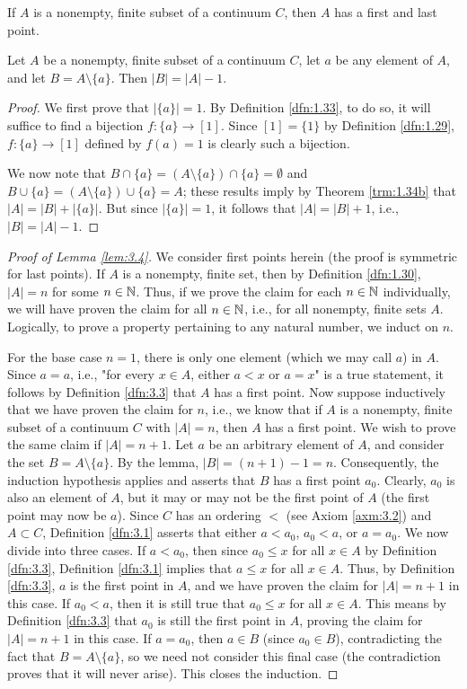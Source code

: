 \documentclass[../main.tex]{subfiles}
\begin{document}
\begin{lemma}\label{lem:3.4}
    If $A$ is a nonempty, finite subset of a continuum $C$, then $A$ has a first and last point.
    \begin{lemma*}
        Let $A$ be a nonempty, finite subset of a continuum $C$, let $a$ be any element of $A$, and let $B=A\setminus\{a\}$. Then $|B|=|A|-1$.
        \begin{proof}
            We first prove that $|\{a\}|=1$. By Definition \ref{dfn:1.33}, to do so, it will suffice to find a bijection $f:\{a\}\to[1]$. Since $[1]=\{1\}$ by Definition \ref{dfn:1.29}, $f:\{a\}\to[1]$ defined by $f(a)=1$ is clearly such a bijection.\par
            We now note that $B\cap\{a\}=(A\setminus\{a\})\cap\{a\}=\emptyset$ and $B\cup\{a\}=(A\setminus\{a\})\cup\{a\}=A$; these results imply by Theorem \ref{trm:1.34b} that $|A|=|B|+|\{a\}|$. But since $|\{a\}|=1$, it follows that $|A|=|B|+1$, i.e., $|B|=|A|-1$.
        \end{proof}
    \end{lemma*}
    \begin{proof}[Proof of Lemma \ref{lem:3.4}]
        We consider first points herein (the proof is symmetric for last points). If $A$ is a nonempty, finite set, then by Definition \ref{dfn:1.30}, $|A|=n$ for some $n\in\mathbb{N}$. Thus, if we prove the claim for each $n\in\mathbb{N}$ individually, we will have proven the claim for all $n\in\mathbb{N}$, i.e., for all nonempty, finite sets $A$. Logically, to prove a property pertaining to any natural number, we induct on $n$.\par
        For the base case $n=1$, there is only one element (which we may call $a$) in $A$. Since $a=a$, i.e., "for every $x\in A$, either $a<x$ or $a=x$" is a true statement, it follows by Definition \ref{dfn:3.3} that $A$ has a first point. Now suppose inductively that we have proven the claim for $n$, i.e., we know that if $A$ is a nonempty, finite subset of a continuum $C$ with $|A|=n$, then $A$ has a first point. We wish to prove the same claim if $|A|=n+1$. Let $a$ be an arbitrary element of $A$, and consider the set $B=A\setminus\{a\}$. By the lemma, $|B|=(n+1)-1=n$. Consequently, the induction hypothesis applies and asserts that $B$ has a first point $a_0$. Clearly, $a_0$ is also an element of $A$, but it may or may not be the first point of $A$ (the first point may now be $a$). Since $C$ has an ordering $<$ (see Axiom \ref{axm:3.2}) and $A\subset C$, Definition \ref{dfn:3.1} asserts that either $a<a_0$, $a_0<a$, or $a=a_0$. We now divide into three cases. If $a<a_0$, then since $a_0\leq x$ for all $x\in A$ by Definition \ref{dfn:3.3}, Definition \ref{dfn:3.1} implies that $a\leq x$ for all $x\in A$. Thus, by Definition \ref{dfn:3.3}, $a$ is the first point in $A$, and we have proven the claim for $|A|=n+1$ in this case. If $a_0<a$, then it is still true that $a_0\leq x$ for all $x\in A$. This means by Definition \ref{dfn:3.3} that $a_0$ is still the first point in $A$, proving the claim for $|A|=n+1$ in this case. If $a=a_0$, then $a\in B$ (since $a_0\in B$), contradicting the fact that $B=A\setminus\{a\}$, so we need not consider this final case (the contradiction proves that it will never arise). This closes the induction.

\end{proof}
\end{lemma}
\end{document}
